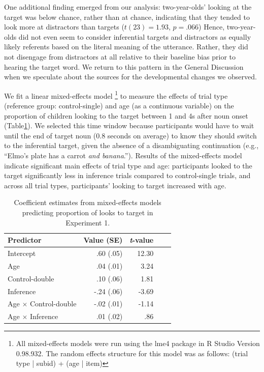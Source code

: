 \documentclass[10pt,letterpaper]{article}
\begin{document}
One additional finding emerged from our analysis: two-year-olds' looking at the target was below chance, rather than at chance, indicating that they tended to look more at distractors than targets ($t(23)  = 1.93$, $p = .066$) Hence, two-year-olds did not even seem to consider inferential targets and distractors as equally likely referents based on the literal meaning of the utterance. Rather, they did not disengage from distractors at all relative to their baseline bias prior to hearing the target word. We return to this pattern in the General Discussion when we speculate about the sources for the developmental changes we observed. 

We fit a linear mixed-effects model \footnote{All mixed-effects models were run using the lme4 package in R Studio Version 0.98.932. The random effects structure for this model was as follows: (trial type | subid) + (age | item)} to measure the effects of trial type (reference group: control-single) and age (as a continuous variable) on the proportion of children looking to the target between 1 and 4s after noun onset (Table\ref{tab:lmer1}). We selected this time window because participants would have to wait until the end of target noun (0.8 seconds on average) to know they should switch to the inferential target, given the absence of a disambiguating continuation (e.g., ``Elmo's plate has a carrot \emph{and banana}.''). Results of the mixed-effects model indicate significant main effects of trial type and age: participants looked to the target significantly less in inference trials compared to control-single trials, and across all trial types, participants' looking to target increased with age. 


\begin{table}[b!]
\caption{\label{tab:lmer1}  Coefficient estimates from mixed-effects models predicting proportion of looks to target in Experiment 1.} 
\begin{center} 
\begin{tabular}{l r r r l} 
\hline
Predictor  &  Value (SE) & \emph{t}-value\\
\hline
Intercept  & .60 (.05) & 12.30 \\
Age & .04 (.01) &  3.24 \\
Control-double & .10 (.06) & 1.81 \\
Inference & -.24 (.06) & -3.69 \\
Age $\times$ Control-double & -.02 (.01) & -1.14 \\
Age $\times$ Inference & .01 (.02) & .86 \\
\hline
\end{tabular} 
\end{center} 
\end{table}
\end{document}
